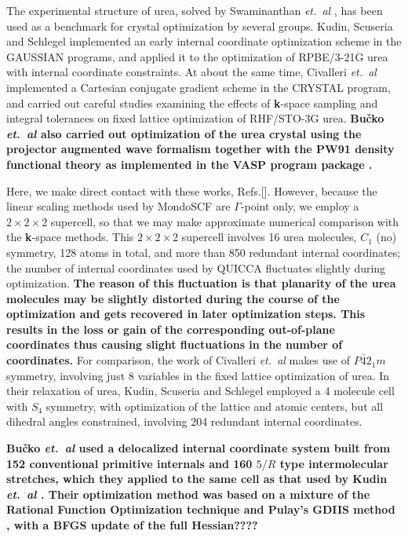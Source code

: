 \twolinestyle{\documentclass[prb,preprint]{revtex4}}
\begin{document}
The experimental structure of urea, solved by Swaminanthan {\em et.~al} \cite{SSwaminathan84},
has been used as a benchmark for crystal optimization by several groups.  
Kudin, Scuseria and Schlegel \cite{KKudin01} implemented an early internal coordinate 
optimization scheme in the GAUSSIAN programs, and applied it to the optimization of
RPBE/3-21G urea with internal coordinate constraints.  At about the same time,  
Civalleri {\em et.~al} \cite{BCivalleri01} implemented a Cartesian conjugate gradient 
scheme in the CRYSTAL program, and carried out careful studies examining the effects of 
{\bf k}-space sampling and integral tolerances on fixed lattice optimization of RHF/STO-3G urea.
{\bf
Bu\v{c}ko {\em et.~al} \cite{TBucko05} also carried out optimization of the
urea crystal using the projector augmented wave formalism together with the PW91
density functional theory as implemented in the VASP program package \cite{GKresse96}. 
}

Here, we make direct contact with these works, Refs.[].
However, because the linear scaling methods used by {\sc MondoSCF} are $\Gamma$-point only, 
we employ a $2\times2\times2$ supercell, so that we may make approximate numerical 
comparison with the {\bf k}-space methods.  This $2\times2\times2$ supercell involves 
16 urea molecules, $C_1$ (no) symmetry, 128 atoms in total, and more than 850 redundant internal 
coordinates;  the number of internal coordinates used by QUICCA fluctuates slightly during optimization.  
{\bf  The reason of this fluctuation is that planarity of the urea molecules
may be slightly distorted during the course of the optimization and gets 
recovered in later optimization steps. This results
in the loss or gain of the corresponding out-of-plane coordinates thus
causing slight fluctuations in the number of coordinates.
}
For comparison, the work of Civalleri {\em et.~al} \cite{BCivalleri01} makes use of $P\bar{4}2_1m$ 
symmetry, involving just 8 variables in the fixed lattice optimization of urea.  In their 
relaxation of urea, Kudin, Scuseria and Schlegel \cite{KKudin01} 
employed a 4 molecule cell with $S_4$ symmetry, with optimization of the lattice and 
atomic centers, but all dihedral angles constrained, involving 204 redundant internal 
coordinates.

{\bf
Bu\v{c}ko {\em et.~al} \cite{TBucko05} used a delocalized internal coordinate system built
from 152 conventional primitive internals and 160 $5/R$ type intermolecular
stretches, which they applied to the same cell as that used by Kudin {\em et.~al} \cite{KKudin01}.
Their optimization method was based on a mixture of the Rational Function 
Optimization technique and Pulay's GDIIS method \cite{FEckert97}, with a
BFGS \cite{RFletcher81} update of the full Hessian????
}
\end{document}
